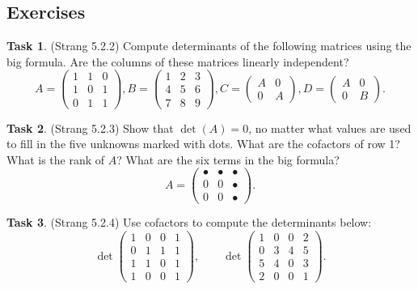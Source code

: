 \documentclass[10pt,]{book}
\theoremstyle{plain}
\theoremstyle{definition}
\numberwithin{equation}{section}
\newtheorem{task}{Task}[chapter]
\begin{document}
\subsection[Exercises]{Exercises}\label{subsection-123}
\begin{task}
\label{task-152}
 (Strang 5.2.2)
        Compute determinants of the following matrices using the big formula. Are
        the columns of these matrices linearly independent?
        \[
          A = \begin{pmatrix} 1 & 1 & 0 \\ 1 & 0 & 1 \\ 0 & 1 & 1 \end{pmatrix},
          B = \begin{pmatrix} 1 & 2 & 3 \\ 4 & 5 & 6 \\ 7 & 8 & 9 \end{pmatrix},
          C = \begin{pmatrix} A & 0 \\ 0 & A \end{pmatrix},
          D = \begin{pmatrix} A & 0 \\ 0 & B \end{pmatrix}.
        \]\end{task}
\begin{task}
\label{task-153}
 (Strang 5.2.3)
        Show that \(\det(A)=0\), no matter what values are used to fill in the
        five unknowns marked with dots. What are the cofactors of row 1? What is
        the rank of \(A\)? What are the six terms in the big formula?
        \[
          A = \begin{pmatrix} \bullet & \bullet & \bullet \\
          0 & 0 & \bullet \\ 0 & 0 & \bullet \end{pmatrix}.
        \]\end{task}
\begin{task}
\label{task-154}
 (Strang 5.2.4)
        Use cofactors to compute the determinants below:
        \[
          \det \begin{pmatrix} 1 & 0 & 0 & 1 \\ 0 & 1 & 1 & 1 \\
          1 & 1 & 0 & 1 \\ 1 & 0 & 0 & 1 \end{pmatrix}, \qquad
          \det \begin{pmatrix} 1 & 0 & 0 & 2 \\ 0 & 3 & 4 & 5 \\
          5 & 4 & 0 & 3 \\ 2 & 0 & 0 & 1 \end{pmatrix}.
        \]\end{task}
\end{document}
